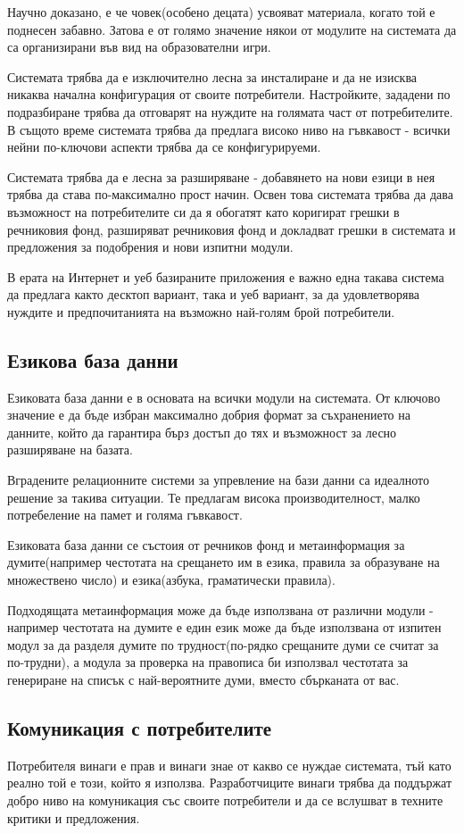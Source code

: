 Научно доказано, е че човек(особено децата) усвояват материала, когато
той е поднесен забавно. Затова е от голямо значение някои от модулите
на системата да са организирани във вид на образователни игри.

Системата трябва да е изключително лесна за инсталиране и да не
изисква никаква начална конфигурация от своите
потребители. Настройките, зададени по подразбиране трябва да отговарят
на нуждите на голямата част от потребителите. В същото време системата
трябва да предлага високо ниво на гъвкавост - всички нейни по-ключови
аспекти трябва да се конфигурируеми. 

Системата трябва да е лесна за разширяване - добавянето на нови езици
в нея трябва да става по-максимално прост начин. Освен това системата
трябва да дава възможност на потребителите си да я обогатят като
коригират грешки в речниковия фонд, разширяват речниковия фонд и
докладват грешки в системата и предложения за подобрения и нови
изпитни модули.

В ерата на Интернет и уеб базираните приложения е важно една такава
система да предлага както десктоп вариант, така и уеб вариант, за да
удовлетворява нуждите и предпочитанията на възможно най-голям брой
потребители. 
\subsection{Езикова база данни}
Езиковата база данни е в основата на всички модули на системата. От
ключово значение е да бъде избран максимално добрия формат за
съхранението на данните, който да гарантира бърз достъп до тях и
възможност за лесно разширяване на базата. 

Вградените релационните системи за упревление на бази данни са
идеалното решение за такива ситуации. Те предлагам висока
производителност, малко потребеление на памет и голяма
гъвкавост. 

Езиковата база данни се състоия от речников фонд и метаинформация за
думите(например честотата на срещането им в езика, правила за
образуване на множествено число) и езика(азбука, граматически
правила).

Подходящата метаинформация може да бъде използвана от различни модули
- например честотата на думите е един език може да бъде използвана от
изпитен модул за да разделя думите по трудност(по-рядко срещаните думи
се считат за по-трудни), а модула за проверка на правописа би
използвал честотата за генериране на списък с най-вероятните думи,
вместо сбърканата от вас.
\subsection{Комуникация с потребителите}
Потребителя винаги е прав и винаги знае от какво се нуждае системата,
тъй като реално той е този, който я използва. Разработчиците винаги
трябва да поддържат добро ниво на комуникация със своите потребители и
да се вслушват в техните критики и предложения. 

